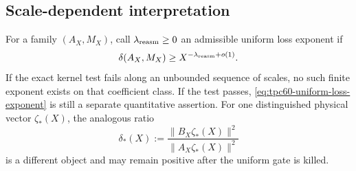 \subsection{Scale-dependent interpretation}

For a family \((A_X,M_X)\), call \(\lambda_{\rm reasm}\ge0\) an admissible
uniform loss exponent if
\begin{equation}
 \delta(A_X,M_X)
 \ge X^{-\lambda_{\rm reasm}+o(1)}.
 \label{eq:tpc60-uniform-loss-exponent}
\end{equation}
If the exact kernel test fails along an unbounded sequence of scales, no
such finite exponent exists on that coefficient class.  If the test passes,
\eqref{eq:tpc60-uniform-loss-exponent} is still a separate quantitative
assertion.  For one distinguished physical vector \(\zeta_*(X)\), the
analogous ratio
\begin{equation}
 \delta_*(X)
 :=\frac{\|B_X\zeta_*(X)\|^2}{\|A_X\zeta_*(X)\|^2}
 \label{eq:tpc60-distinguished-ratio}
\end{equation}
is a different object and may remain positive after the uniform gate is
killed.
